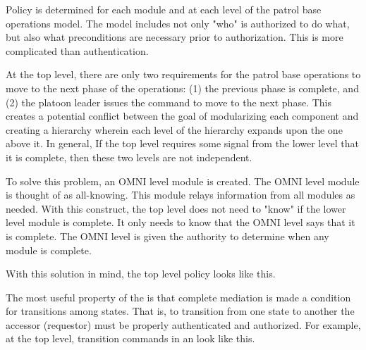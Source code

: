 \documentclass[../../main/main.tex]{subfiles}
\begin{document}
Policy is determined for each module and at each level of the patrol base operations model.  The model includes not only "who" is authorized to do what, but also what preconditions are necessary prior to authorization.  This is more complicated than authentication.

At the top level, there are only two requirements for the patrol base operations to move to the next phase of the operations: (1) the previous phase is complete, and (2) the platoon leader issues the command to move to the next phase.  This creates a potential conflict between the goal of modularizing each component and creating a hierarchy wherein each level of the hierarchy expands upon the one above it.  In general, If the top level requires some signal from the lower level that it is complete, then these two levels are not independent. 

To solve this problem, an OMNI level module is created.  The OMNI level module is thought of as all-knowing.  This module relays information from all modules as needed.  With this construct, the top level does not need to "know" if the lower level module is complete.  It only needs to know that the OMNI level says that it is complete.  The OMNI level is given the authority to determine when any module is complete.


With this solution in mind, the top level policy looks like this.

The most useful property of the  is that complete mediation is made a condition for transitions among states.  That is, to transition from one state to another the accessor (requestor) must be properly authenticated and authorized.  For example, at the top level, transition commands in an  look like this.
\end{document}
